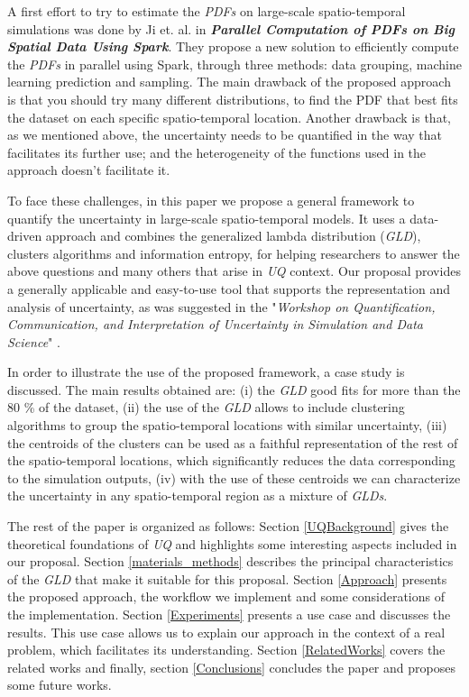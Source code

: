 A first effort to try to estimate the \textit{PDFs} on large-scale spatio-temporal simulations was done by {Ji et. al.} in \textbf{\textit{Parallel Computation of PDFs on Big Spatial Data Using Spark}}. They propose a new solution to efficiently compute the \textit{PDFs} in parallel using Spark, through three methods: data grouping, machine learning prediction and sampling. The main drawback of the proposed approach is that you should try many different distributions, to find the PDF that best fits the dataset on each specific spatio-temporal location. Another drawback is that, as we mentioned above, the uncertainty needs to be quantified in the way that facilitates its further use; and the heterogeneity of the functions used in the approach doesn't facilitate it. 

To face these challenges, in this paper we propose a general framework to quantify the uncertainty in large-scale spatio-temporal models. It uses a data-driven approach and combines the generalized lambda distribution (\textit{GLD}), clusters algorithms and information entropy, for helping researchers to answer the above questions and many others that arise in \textit{UQ} context. Our proposal provides a generally applicable and easy-to-use tool that supports the representation and analysis of uncertainty, as was suggested in the "\textit{Workshop on Quantification, Communication, and Interpretation of Uncertainty in Simulation and Data Science}" \cite{Tobergte2013}. 

In order to illustrate the use of the proposed framework, a case study is discussed. The main results obtained are: (i) the \textit{GLD} good fits for more than the 80 \% of the dataset, (ii) the use of the \textit{GLD} allows to include clustering algorithms to group the spatio-temporal locations with similar uncertainty, (iii) the centroids  of the clusters can be used as a faithful representation of the rest of the spatio-temporal locations, which significantly reduces the data corresponding to the simulation outputs, (iv) with the use of these centroids we can characterize the uncertainty in any spatio-temporal region as a mixture of \textit{GLDs}.

The rest of the paper is organized as follows: Section \ref{UQBackground} gives the theoretical foundations of \textit{UQ} and highlights some interesting aspects included in our proposal. Section \ref{materials_methods} describes the principal characteristics of the \textit{GLD} that make it suitable for this proposal. Section \ref{Approach} presents the proposed approach, the workflow we implement and some considerations of the implementation. Section \ref{Experiments} presents a use case and discusses the results. This use case allows us to explain our approach in the context of a real problem, which facilitates its understanding. Section \ref{RelatedWorks} covers the related works and finally, section \ref{Conclusions} concludes the paper and proposes some future works.

